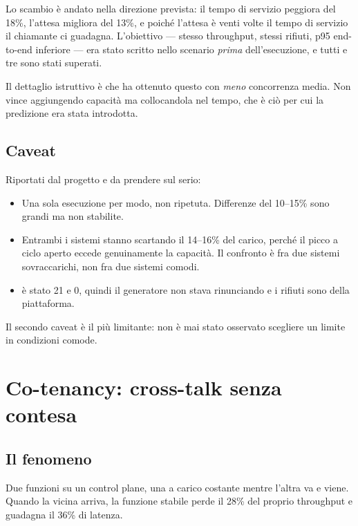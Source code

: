 Lo scambio \`e andato nella direzione prevista: il tempo di servizio peggiora del
18\%, l'attesa migliora del 13\%, e poich\'e l'attesa \`e venti volte il tempo di
servizio il chiamante ci guadagna. L'obiettivo --- stesso throughput, stessi
rifiuti, p95 end-to-end inferiore --- era stato scritto nello scenario
\emph{prima} dell'esecuzione, e tutti e tre sono stati superati.

Il dettaglio istruttivo \`e che  ha ottenuto questo con
\emph{meno} concorrenza media. Non vince aggiungendo capacit\`a ma collocandola
nel tempo, che \`e ci\`o per cui la predizione era stata introdotta.

\subsection{Caveat}

Riportati dal progetto e da prendere sul serio:

\begin{itemize}[leftmargin=*]
  \item Una sola esecuzione per modo, non ripetuta. Differenze del 10--15\% sono
  grandi ma non stabilite.
  \item Entrambi i sistemi stanno scartando il 14--16\% del carico, perch\'e il
  picco a ciclo aperto eccede genuinamente la capacit\`a. Il confronto \`e fra
  due sistemi sovraccarichi, non fra due sistemi comodi.
  \item {} \`e stato 21 e 0, quindi il generatore non
  stava rinunciando e i rifiuti sono della piattaforma.
\end{itemize}

Il secondo caveat \`e il pi\`u limitante:  non \`e mai stato
osservato scegliere un limite in condizioni comode.

\section{Co-tenancy: cross-talk senza contesa}

\subsection{Il fenomeno}

Due funzioni su un control plane, una a carico costante mentre l'altra va e
viene. Quando la vicina arriva, la funzione stabile perde il 28\% del proprio
throughput e guadagna il 36\% di latenza.

